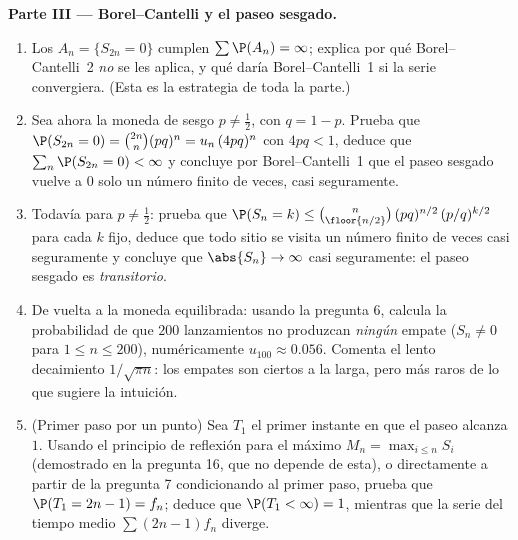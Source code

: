 \begin{problem}
\medskip
\noindent\textbf{Parte III --- Borel--Cantelli y el paseo sesgado.}
\begin{enumerate}[resume]
  \item Los  $A_n = \{S_{2n} = 0\}$ cumplen $\sum\P(A_n) =
        \infty$; explica por qué Borel--Cantelli~2 \emph{no} se les
        aplica, y qué daría Borel--Cantelli~1 si la serie
        convergiera. (Esta es la estrategia de toda la parte.)
  \item Sea ahora la moneda de sesgo $p \neq \frac12$, con $q = 1 -
        p$. Prueba que $\P(S_{2n} = 0) = \binom{2n}n(pq)^n =
        u_n\,(4pq)^n$ con $4pq < 1$, deduce que $\sum_n\P(S_{2n} =
        0) < \infty$ y concluye por Borel--Cantelli~1 que el paseo
        sesgado vuelve a $0$ solo un número finito de veces, casi
        seguramente.
  \item Todavía para $p \neq \frac12$: prueba que $\P(S_n = k) \leq
        \binom{n}{\floor{n/2}}\,(pq)^{n/2}\,(p/q)^{k/2}$ para cada
        $k$ fijo, deduce que todo sitio se visita un número finito
        de veces casi seguramente y concluye que $\abs{S_n} \to
        \infty$ casi seguramente: el paseo sesgado es
        \emph{transitorio}.
  \item De vuelta a la moneda equilibrada: usando la pregunta 6,
        calcula la probabilidad de que $200$ lanzamientos no
        produzcan \emph{ningún} empate ($S_n \neq 0$ para $1 \leq n
        \leq 200$), numéricamente $u_{100} \approx 0.056$. Comenta
        el lento decaimiento $1/\sqrt{\pi n}$: los empates son
        ciertos a la larga, pero más raros de lo que sugiere la
        intuición.
  \item (Primer paso por un punto) Sea $T_1$ el primer instante en
        que el paseo alcanza $1$. Usando el principio de reflexión
        para el máximo $M_n = \max_{i\leq n}S_i$ (demostrado en la
        pregunta 16, que no depende de esta), o directamente a
        partir de la pregunta 7 condicionando al primer paso, prueba
        que $\P(T_1 = 2n - 1) = f_n$; deduce que $\P(T_1 < \infty) =
        1$, mientras que la serie del tiempo medio $\sum(2n-1)f_n$
        diverge.
\end{enumerate}


\end{problem}
